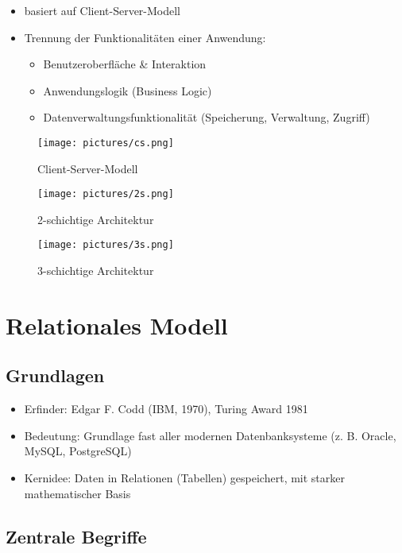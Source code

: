 \documentclass[12pt,a4paper]{article}
\begin{document}
\begin{itemize}
\item basiert auf Client-Server-Modell
\item Trennung der Funktionalitäten einer Anwendung:
\begin{itemize}
\item Benutzeroberfläche \& Interaktion
\item Anwendungslogik (Business Logic)
\item Datenverwaltungsfunktionalität (Speicherung, Verwaltung, Zugriff)
\end{itemize}
\end{itemize}

\begin{figure}[H]
\centering
\begin{minipage}[t]{0.32\textwidth}
\centering
\texttt{[image: pictures/cs.png]}
\caption{Client-Server-Modell}
\end{minipage}
\hfill
\begin{minipage}[t]{0.32\textwidth}
\centering
\texttt{[image: pictures/2s.png]}
\caption{2-schichtige Architektur}
\end{minipage}
\hfill
\begin{minipage}[t]{0.32\textwidth}
\centering
\texttt{[image: pictures/3s.png]}
\caption{3-schichtige Architektur}
\end{minipage}
\end{figure}

\section{Relationales Modell}

\subsection{Grundlagen}

\begin{itemize}
\item Erfinder: Edgar F. Codd (IBM, 1970), Turing Award 1981
\item Bedeutung: Grundlage fast aller modernen Datenbanksysteme (z. B. Oracle, MySQL, PostgreSQL)
\item Kernidee: Daten in Relationen (Tabellen) gespeichert, mit starker mathematischer Basis
\end{itemize}

\subsection{Zentrale Begriffe}
\end{document}
